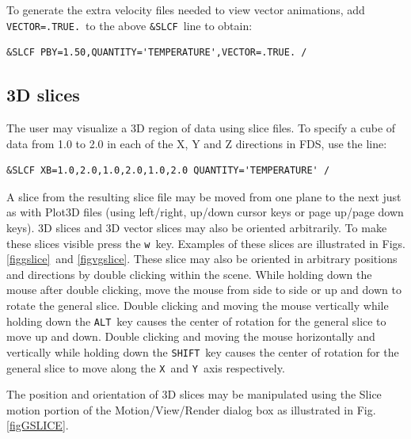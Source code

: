 \documentclass[11pt,twoside]{book}
\begin{document}
To generate the extra velocity files needed to view vector
animations, add {\tt VECTOR=.TRUE.}\ to the above {\tt \&SLCF}\ line
to obtain:
\begin{lstlisting}
&SLCF PBY=1.50,QUANTITY='TEMPERATURE',VECTOR=.TRUE. /
\end{lstlisting}

\subsection{3D slices}
The user may visualize a 3D region of data using slice files.
To specify a cube of data from 1.0 to 2.0 in each
of the X, Y and Z directions in FDS, use the line:
\begin{lstlisting}
&SLCF XB=1.0,2.0,1.0,2.0,1.0,2.0 QUANTITY='TEMPERATURE' /
\end{lstlisting}

A slice from the resulting slice file
may be moved from one plane to the next just as with Plot3D
files (using left/right, up/down cursor keys or page up/page down
keys).  3D slices and 3D vector slices may also be oriented arbitrarily.
To make these slices visible press the {\tt w}\ key.  Examples of
these slices are illustrated in Figs. \ref{figgslice}\ and \ref{figvgslice}.
These slice may also be oriented in arbitrary positions and directions by
double clicking within the scene.  While holding down the mouse after double clicking,
move the mouse from
side to side or up and down to rotate the general slice.  Double clicking and moving
the mouse vertically while holding down the {\tt ALT}\
key causes the center of rotation for the general slice to move up and down.
Double clicking and moving the mouse horizontally and vertically while holding down
the {\tt SHIFT}\ key causes the center of rotation for the general slice to move along
the {\tt X}\ and {\tt Y}\ axis respectively.

The position and orientation of 3D slices may be manipulated using the Slice motion
portion of the Motion/View/Render dialog box as illustrated
in Fig. \ref{figGSLICE}.
\end{document}
